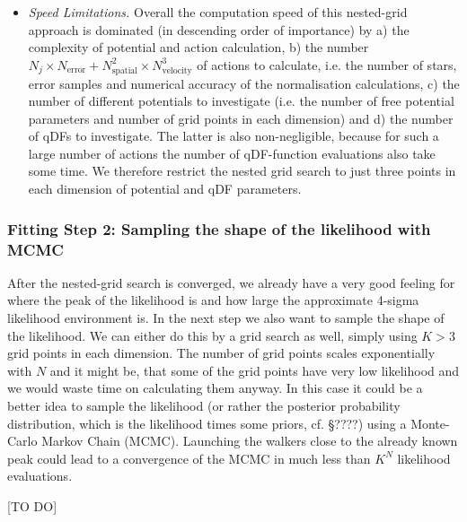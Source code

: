 \begin{itemize}
\item \emph{Speed Limitations.} Overall the computation speed of this nested-grid approach is dominated (in descending order of importance) by a) the complexity of potential and action calculation, b) the number $N_j \times N_\text{error} + N_\text{spatial}^2 \times N_\text{velocity}^3$ of actions to calculate, i.e. the number of stars, error samples and numerical accuracy of the normalisation calculations, c) the number of different potentials to investigate (i.e. the number of free potential parameters and number of grid points in each dimension) and d) the number of qDFs to investigate. The latter is also non-negligible, because for such a large number of actions the number of  qDF-function evaluations also take some time. We therefore restrict the nested grid search to just three points in each dimension of potential and qDF parameters.
\end{itemize}

\subsubsection{Fitting Step 2: Sampling the shape of the likelihood with MCMC}

After the nested-grid search is converged, we already have a very good feeling for where the peak of the likelihood is and how large the approximate 4-sigma likelihood environment is. In the next step we also want to sample the shape of the likelihood. We can either do this by a grid search as well, simply using $K>3$ grid points in each dimension. The number of grid points scales exponentially with $N$ and it might be, that some of the grid points have very low likelihood and we would waste time on calculating them anyway. In this case it could be a better idea to sample the likelihood (or rather the posterior probability distribution, which is the likelihood times some priors, cf. \S ????) using a Monte-Carlo Markov Chain (MCMC). Launching the walkers close to the already known peak could lead to a convergence of the MCMC in much less than $K^N$ likelihood evaluations.

[TO DO]
